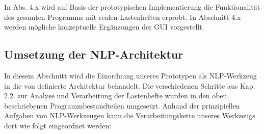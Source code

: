 \documentclass[12pt]{report}
\begin{document}
In Abs. 4.x wird auf Basis der prototypischen Implementierung die Funktionalität des gesamten Programms mit realen Lastenheften erprobt. In Abschnitt 4.x werden mögliche konzeptuelle Ergänzungen der GUI vorgestellt. 

\subsection{Umsetzung der NLP-Architektur}
In diesem Abschnitt wird die Einordnung unseres Prototypen als NLP-Werkzeug in die von \cite{cop04} definierte Architektur behandelt. Die verschiedenen Schritte aus Kap. 2.2. zur Analyse und Verarbeitung der Lastenhefte wurden in den oben beschriebenen Programmbestandteilen umgesetzt. Anhand der prinzipiellen Aufgaben von NLP-Werkzeugen kann die Verarbeitungskette unseres Werkzeugs dort wie folgt eingeordnet werden:
\end{document}
